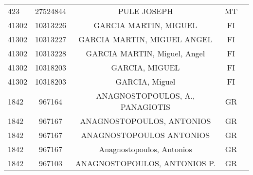 \begin{longtable}{|l|c|c|c|c|}
       423 &   27524844 &                                        PULE JOSEPH &      MT \\
     41302 &   10313226 &                              GARCIA MARTIN, MIGUEL &      FI \\
     41302 &   10313227 &                        GARCIA MARTIN, MIGUEL ANGEL &      FI \\
     41302 &   10313228 &                       GARCIA MARTIN, Miguel, Angel &      FI \\
     41302 &   10318203 &                                     GARCIA, MIGUEL &      FI \\
     41302 &   10318203 &                                     GARCIA, Miguel &      FI \\
      1842 &     967164 &                    ANAGNOSTOPOULOS, A., PANAGIOTIS &      GR \\
      1842 &     967167 &                          ANAGNOSTOPOULOS, ANTONIOS &      GR \\
      1842 &     967167 &                           ANAGNOSTOPOULOS ANTONIOS &      GR \\
      1842 &     967167 &                          Anagnostopoulos, Antonios &      GR \\
      1842 &     967103 &                       ANAGNOSTOPOULOS, ANTONIOS P. &      GR \\
\hline
\end{longtable}
